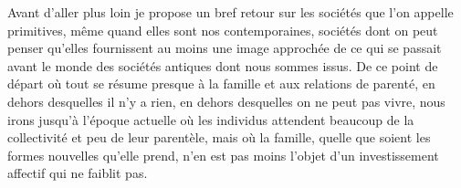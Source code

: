 Avant d'aller plus loin je propose un bref retour sur les sociétés
que l'on appelle primitives, même quand elles sont nos contemporaines,
sociétés dont on peut penser qu'elles fournissent au moins une image
approchée de ce qui se passait avant le monde des sociétés antiques dont
nous sommes issus. De ce point de départ où tout se résume presque à la
famille et aux relations de parenté, en dehors desquelles il n'y a rien, en
dehors desquelles on ne peut pas vivre, nous irons jusqu'à l'époque actuelle
où les individus attendent beaucoup de la collectivité et peu de leur
parentèle, mais où la famille, quelle que soient les formes nouvelles
qu'elle prend, n'en est pas moins l'objet d'un investissement affectif qui
ne faiblit pas.

